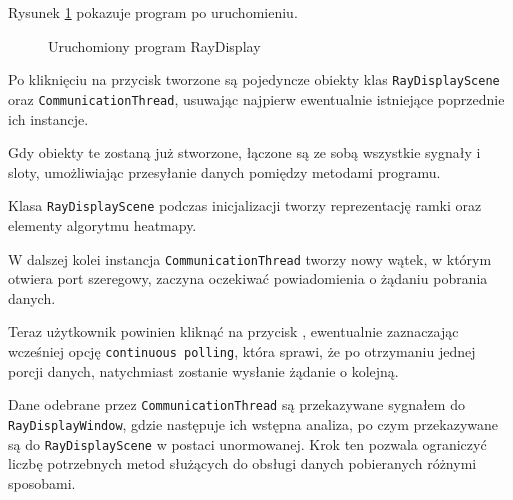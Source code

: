 Rysunek \ref{fig:raydisplay} pokazuje program po uruchomieniu.

\begin{figure}
 \centering
 \caption{Uruchomiony program RayDisplay}
 \label{fig:raydisplay}
\end{figure}

Po kliknięciu na przycisk {} tworzone są pojedyncze obiekty klas \verb|RayDisplayScene| oraz \verb|CommunicationThread|, usuwając najpierw ewentualnie istniejące poprzednie ich instancje.

Gdy obiekty te zostaną już stworzone, łączone są ze sobą wszystkie sygnały i sloty, umożliwiając przesyłanie danych pomiędzy metodami programu.

Klasa \verb|RayDisplayScene| podczas inicjalizacji tworzy reprezentację ramki oraz elementy algorytmu heatmapy.

W dalszej kolei instancja \verb|CommunicationThread| tworzy nowy wątek, w którym otwiera port szeregowy, zaczyna oczekiwać powiadomienia o żądaniu pobrania danych.

Teraz użytkownik powinien kliknąć na przycisk , ewentualnie zaznaczając wcześniej opcję \texttt{continuous polling}, która sprawi, że po otrzymaniu jednej porcji danych, natychmiast zostanie wysłanie żądanie o kolejną.

Dane odebrane przez \verb|CommunicationThread| są przekazywane sygnałem do \verb|RayDisplayWindow|, gdzie następuje ich wstępna analiza, po czym przekazywane są do \verb|RayDisplayScene| w postaci unormowanej.
Krok ten pozwala ograniczyć liczbę potrzebnych metod służących do obsługi danych pobieranych różnymi sposobami.\\

